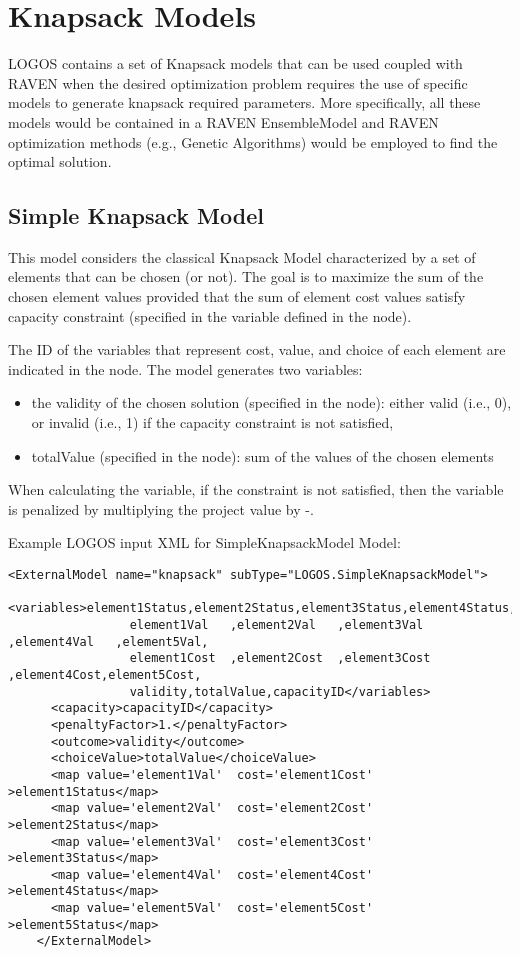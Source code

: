 \section{Knapsack Models}
\label{sec:KnapsackModels}

LOGOS contains a set of Knapsack models that can be used coupled with RAVEN when 
the desired optimization problem requires the use of specific models to generate
knapsack required parameters.
More specifically, all these models would be contained in a RAVEN EnsembleModel 
and RAVEN optimization methods (e.g., Genetic Algorithms) would be employed to 
find the optimal solution.


\subsection{Simple Knapsack Model}
\label{subsec:SimpleKnapsackModel}
This model considers the classical Knapsack Model characterized by a set of elements 
that can be chosen (or not).
The goal is to maximize the sum of the chosen element values provided that the sum of 
element cost values satisfy capacity constraint (specified in the variable defined 
in the  node).

The ID of the variables that represent cost, value, and choice of each element are 
indicated in the  node.
The model generates two variables:
\begin{itemize}
  \item the validity of the chosen solution (specified in the  node): either 
        valid (i.e., 0), or invalid (i.e., 1) if the capacity constraint is not satisfied,
  \item totalValue (specified in the  node): sum of the values of the 
        chosen elements
\end{itemize}

When calculating the  variable, if the  constraint 
is not satisfied, then the  variable is penalized by multiplying the 
project value by -.

Example LOGOS input XML for SimpleKnapsackModel Model:
\begin{lstlisting}[style=XML]
    <ExternalModel name="knapsack" subType="LOGOS.SimpleKnapsackModel">
      <variables>element1Status,element2Status,element3Status,element4Status,element5Status,
                 element1Val   ,element2Val   ,element3Val   ,element4Val   ,element5Val,
                 element1Cost  ,element2Cost  ,element3Cost  ,element4Cost,element5Cost,
                 validity,totalValue,capacityID</variables>
      <capacity>capacityID</capacity>
      <penaltyFactor>1.</penaltyFactor>
      <outcome>validity</outcome>
      <choiceValue>totalValue</choiceValue>
      <map value='element1Val'  cost='element1Cost' >element1Status</map>
      <map value='element2Val'  cost='element2Cost' >element2Status</map>
      <map value='element3Val'  cost='element3Cost' >element3Status</map>
      <map value='element4Val'  cost='element4Cost' >element4Status</map>
      <map value='element5Val'  cost='element5Cost' >element5Status</map>
    </ExternalModel>
\end{lstlisting}



